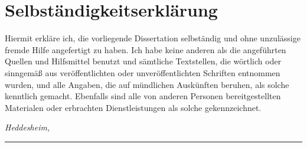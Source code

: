 %
\chapter*{Selbständigkeitserklärung}
\label{sec:declaration}
\thispagestyle{empty}

Hiermit erkläre ich, die vorliegende Dissertation selbständig und ohne
unzulässige fremde Hilfe angefertigt zu haben. Ich habe keine anderen als die
angeführten Quellen und Hilfsmittel benutzt und sämtliche Textstellen, die
wörtlich oder sinngemäß aus veröffentlichten oder unveröffentlichten
Schriften entnommen wurden, und alle Angaben, die auf mündlichen
Auskünften beruhen, als solche kenntlich gemacht. Ebenfalls sind alle von
anderen Personen bereitgestellten Materialen oder erbrachten Dienstleistungen
als solche gekennzeichnet.
\bigskip

\noindent\textit{Heddesheim, \thesisDate}

\smallskip

\begin{flushright}
	\begin{minipage}{5cm}
		\rule{\textwidth}{1pt}
		\centering\thesisName
	\end{minipage}
\end{flushright}

